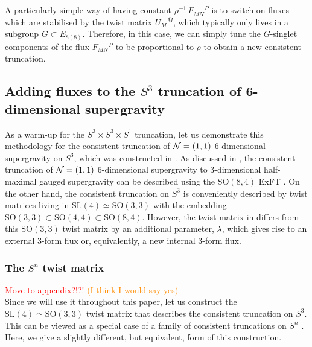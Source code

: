 \documentclass[a4paper, 11pt]{article}
\numberwithin{equation}{section}
\newcommand{\ov}[1]{\overline{#1}}
\newcommand{\SL}[1]{\mathrm{SL}( #1 )}
\newcommand{\SO}[1]{\mathrm{SO}( #1 )}
\newcommand{\EE}{\ensuremath{E_{8(8)}}\xspace}
\newcommand{\+}{\oplus}
\newcommand{\fl}[1]{\ov{#1}}
\newcommand{\EM}[1]{\textcolor{red}{#1}}
\newcommand{\CE}[1]{\textcolor{darkorange}{#1}}
\begin{document}
A particularly simple way of having constant $\rho^{-1}\, F_{\fl{M}\fl{N}}{}^{\fl{P}}$ is to switch on fluxes which are stabilised by the twist matrix $U_M{}^{\fl{M}}$, which typically only lives in a subgroup $G \subset \EE$. Therefore, in this case, we can simply tune the $G$-singlet components of the flux $F_{MN}{}^P$ to be proportional to $\rho$ to obtain a new consistent truncation.

\subsection{Adding fluxes to the $S^3$ truncation of 6-dimensional supergravity} \label{s:S3Flux}
As a warm-up for the $S^3 \times S^3 \times S^1$ truncation, let us demonstrate this methodology for the consistent truncation of ${\cal N}=(1,1)$ 6-dimensional supergravity on $S^3$, which was constructed in \cite{Eloy:2021fhc}. As discussed in \cite{Eloy:2021fhc}, the consistent truncation of ${\cal N}=(1,1)$ 6-dimensional supergravity to 3-dimensional half-maximal gauged supergravity can be described using the $\SO{8,4}$ ExFT \cite{Hohm:2017wtr,Samtleben:2019zrh}. On the other hand, the consistent truncation on $S^3$ is conveniently described by twist matrices living in $\SL{4} \simeq \SO{3,3}$ \cite{Lee:2014mla,Hohm:2014qga,Baguet:2015iou} with the embedding $\SO{3,3} \subset \SO{4,4} \subset \SO{8,4}$. However, the twist matrix in \cite{Eloy:2021fhc} differs from this $\SO{3,3}$ twist matrix \cite{Lee:2014mla,Hohm:2014qga,Baguet:2015iou} by an additional parameter, $\lambda$, which gives rise to an external 3-form flux or, equivalently, a new internal 3-form flux.

\subsubsection{The $S^n$ twist matrix} \label{s:SLn}
\EM{Move to appendix?!?!} \CE{(I think I would say yes)}\\
Since we will use it throughout this paper, let us construct the $\SL{4} \simeq \SO{3,3}$ twist matrix that describes the consistent truncation on $S^3$. This can be viewed as a special case of a family of consistent truncations on $S^n$ \cite{Lee:2014mla,Hohm:2014qga,Baguet:2015iou}. Here, we give a slightly different, but equivalent, form of this construction.
\end{document}
